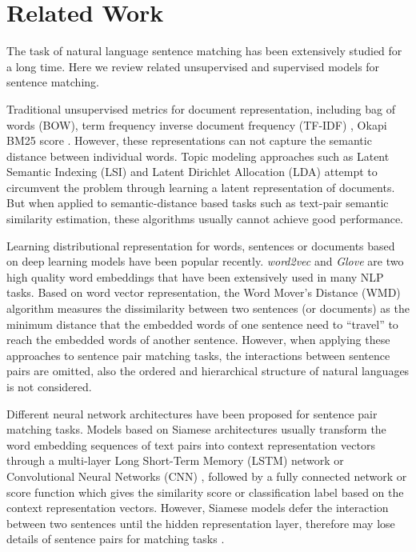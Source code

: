 \section{Related Work}
\label{sec:related}


The task of natural language sentence matching has been extensively studied for a long time. Here we review related unsupervised and supervised models for sentence matching.

Traditional unsupervised metrics for document representation, including bag of words (BOW), term frequency inverse document frequency (TF-IDF) \cite{wu2008interpreting}, Okapi BM25 score \cite{robertson1994some}. However, these representations can not capture the semantic distance between individual words.
Topic modeling approaches such as Latent Semantic Indexing (LSI) \cite{deerwester1990indexing} and Latent Dirichlet Allocation (LDA) \cite{blei2003latent} attempt to circumvent the problem through learning a latent representation of documents.
But when applied to semantic-distance based tasks such as text-pair semantic similarity estimation, these algorithms usually cannot achieve good performance.


Learning distributional representation for words, sentences or documents based on deep learning models have been popular recently. \textit{word2vec} \cite{mikolov2013efficient} and \textit{Glove} \cite{pennington2014glove} are two high quality word embeddings that have been extensively used in many NLP tasks. Based on word vector representation, the Word Mover's Distance (WMD) \cite{kusner2015word} algorithm measures the dissimilarity between two sentences (or documents)
as the minimum distance that
the embedded words of one sentence need to
``travel'' to reach the embedded words of another
sentence. However, when applying these approaches to sentence pair matching tasks, the interactions between sentence pairs are omitted, also the ordered and hierarchical structure of natural languages is not considered.


Different neural network architectures have been proposed for sentence pair matching tasks. Models based on Siamese architectures \cite{mueller2016siamese,severyn2015learning,neculoiu2016learning,baudivs2016sentence} usually transform the word embedding sequences of text pairs into context representation vectors through a multi-layer Long Short-Term Memory (LSTM) \cite{sundermeyer2012lstm} network or Convolutional Neural Networks (CNN) \cite{krizhevsky2012imagenet}, followed by a fully connected network or score function which gives the similarity score or classification label based on the context representation vectors. However, Siamese models defer the interaction between two sentences until the hidden representation layer, therefore may lose details of sentence pairs for matching tasks \cite{hu2014convolutional}.

